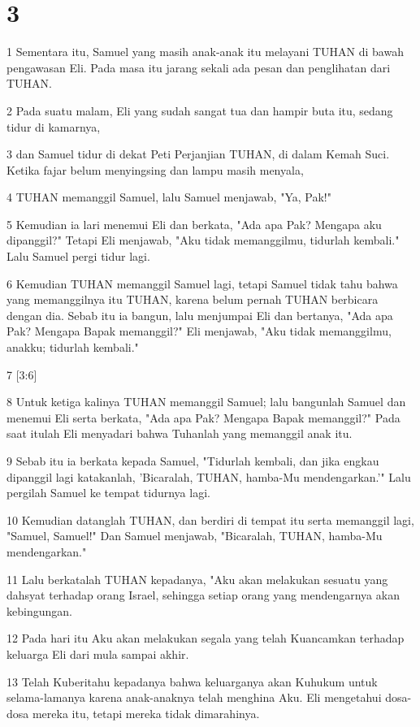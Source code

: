 \chapter{3}

\par 1 Sementara itu, Samuel yang masih anak-anak itu melayani TUHAN di bawah pengawasan Eli. Pada masa itu jarang sekali ada pesan dan penglihatan dari TUHAN.
\par 2 Pada suatu malam, Eli yang sudah sangat tua dan hampir buta itu, sedang tidur di kamarnya,
\par 3 dan Samuel tidur di dekat Peti Perjanjian TUHAN, di dalam Kemah Suci. Ketika fajar belum menyingsing dan lampu masih menyala,
\par 4 TUHAN memanggil Samuel, lalu Samuel menjawab, "Ya, Pak!"
\par 5 Kemudian ia lari menemui Eli dan berkata, "Ada apa Pak? Mengapa aku dipanggil?" Tetapi Eli menjawab, "Aku tidak memanggilmu, tidurlah kembali." Lalu Samuel pergi tidur lagi.
\par 6 Kemudian TUHAN memanggil Samuel lagi, tetapi Samuel tidak tahu bahwa yang memanggilnya itu TUHAN, karena belum pernah TUHAN berbicara dengan dia. Sebab itu ia bangun, lalu menjumpai Eli dan bertanya, "Ada apa Pak? Mengapa Bapak memanggil?" Eli menjawab, "Aku tidak memanggilmu, anakku; tidurlah kembali."
\par 7 [3:6]
\par 8 Untuk ketiga kalinya TUHAN memanggil Samuel; lalu bangunlah Samuel dan menemui Eli serta berkata, "Ada apa Pak? Mengapa Bapak memanggil?" Pada saat itulah Eli menyadari bahwa Tuhanlah yang memanggil anak itu.
\par 9 Sebab itu ia berkata kepada Samuel, "Tidurlah kembali, dan jika engkau dipanggil lagi katakanlah, 'Bicaralah, TUHAN, hamba-Mu mendengarkan.'" Lalu pergilah Samuel ke tempat tidurnya lagi.
\par 10 Kemudian datanglah TUHAN, dan berdiri di tempat itu serta memanggil lagi, "Samuel, Samuel!" Dan Samuel menjawab, "Bicaralah, TUHAN, hamba-Mu mendengarkan."
\par 11 Lalu berkatalah TUHAN kepadanya, "Aku akan melakukan sesuatu yang dahsyat terhadap orang Israel, sehingga setiap orang yang mendengarnya akan kebingungan.
\par 12 Pada hari itu Aku akan melakukan segala yang telah Kuancamkan terhadap keluarga Eli dari mula sampai akhir.
\par 13 Telah Kuberitahu kepadanya bahwa keluarganya akan Kuhukum untuk selama-lamanya karena anak-anaknya telah menghina Aku. Eli mengetahui dosa-dosa mereka itu, tetapi mereka tidak dimarahinya.
